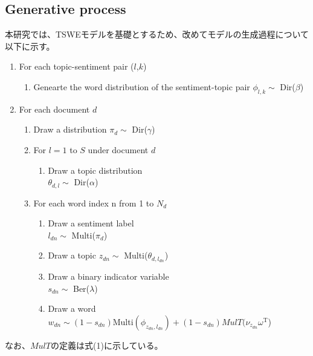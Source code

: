 \documentclass[uplatex]{jsarticle}
\begin{document}
\subsection{Generative process}
本研究では、TSWEモデルを基礎とするため、改めてモデルの生成過程について以下に示す。
\begin{enumerate}
    \item For each topic-sentiment pair ($l$,$k$)
          \begin{enumerate}
              \item Genearte the word distribution of the sentiment-topic pair $\phi_{l,k} \sim $ Dir($\beta$)
          \end{enumerate}
    \item For each document $d$
          \begin{enumerate}
              \item Draw a distribution $\pi_{d} \sim $ Dir($\gamma$)
              \item For $l=1$ to $S$ under document $d$
                    \begin{enumerate}
                        \item Draw a topic distribution \\ $ \theta_{d,l} \sim $ Dir($\alpha$)
                    \end{enumerate}
              \item For each word index n from 1 to $N_{d}$
                    \begin{enumerate}
                        \item Draw a sentiment label \\ $ l_{dn}  \sim$ Multi($\pi_{d}$)
                        \item Draw a topic $z_{dn} \sim $ Multi($\theta_{d, l_{dn}}$)
                        \item Draw a binary indicator variable \\ $s_{dn} \sim $ Ber($\lambda$)
                        \item Draw a word \\$w_{dn}  \sim (1-s_{dn})$Multi$(\phi_{z_{dn},l_{dn}})+(1 - s_{dn})MulT(\nu_{z_{dn}}\omega^{\mathrm{T}}$)
                    \end{enumerate}
          \end{enumerate}
\end{enumerate}
なお、$MulT$の定義は式(1)に示している。
\end{document}
